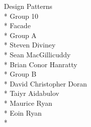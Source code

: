 \documentclass[a4paper,12pt]{article}
\begin{document}
\begin{center}
{\large Design Patterns \\* \newline
Group 10 \\*
Facade \\*
Group A} \\* \newline
Steven Diviney \\*
Sean MacGillicuddy \\*
Brian Conor Hanratty \\*
\newline
{\large Group B }\\* \newline
David Christopher Doran \\* 
Taiyr Aidabulov \\*
Maurice Ryan \\*
Eoin Ryan \\*
\end{center}
\end{document}
